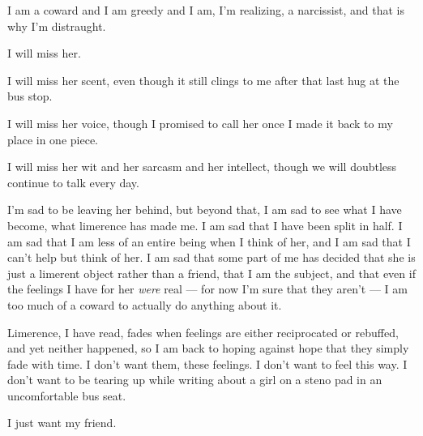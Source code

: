 I am a coward and I am greedy and I am, I'm realizing, a narcissist, and that is why I'm distraught.

I will miss her.

I will miss her scent, even though it still clings to me after that last hug at the bus stop.

I will miss her voice, though I promised to call her once I made it back to my place in one piece.

I will miss her wit and her sarcasm and her intellect, though we will doubtless continue to talk every day.

I'm sad to be leaving her behind, but beyond that, I am sad to see what I have become, what limerence has made me. I am sad that I have been split in half. I am sad that I am less of an entire being when I think of her, and I am sad that I can't help but think of her. I am sad that some part of me has decided that she is just a limerent object rather than a friend, that I am the subject, and that even if the feelings I have for her \emph{were} real --- for now I'm sure that they aren't --- I am too much of a coward to actually do anything about it.

Limerence, I have read, fades when feelings are either reciprocated or rebuffed, and yet neither happened, so I am back to hoping against hope that they simply fade with time. I don't want them, these feelings. I don't want to feel this way. I don't want to be tearing up while writing about a girl on a steno pad in an uncomfortable bus seat.

I just want my friend.

\section{}
